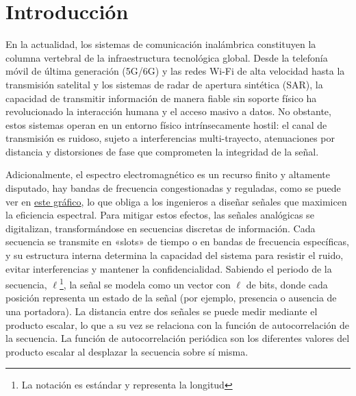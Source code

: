 \documentclass[12pt,a4paper]{tfg_domingo}
\begin{document}

\portada
\frontmatter
\gracias{}
\resumen{}{}
\tableofcontents

\mainmatter

\chapter{Introducción}

En la actualidad, los sistemas de comunicación inalámbrica constituyen
la columna vertebral de la infraestructura tecnológica global. Desde
la telefonía móvil de última generación (5G/6G) y las redes Wi-Fi de
alta velocidad hasta la transmisión satelital y los sistemas de radar
de apertura sintética (SAR), la capacidad de transmitir información de
manera fiable sin soporte físico ha revolucionado la interacción
humana y el acceso masivo a datos. No obstante, estos sistemas operan
en un entorno físico intrínsecamente hostil: el canal de transmisión
es ruidoso, sujeto a interferencias multi-trayecto, atenuaciones por
distancia y distorsiones de fase que comprometen la integridad de la
señal. 

Adicionalmente, el espectro electromagnético es un recurso finito y
altamente disputado, hay bandas de frecuencia congestionadas y
reguladas, como se puede ver en  \href{https://avance.digital.gob.es/espectro/Documents/Poster-CNAF.pdf}{este gráfico}, lo que obliga a los ingenieros a diseñar señales que
maximicen la eficiencia espectral. 
Para mitigar estos efectos, las
señales analógicas se digitalizan, transformándose en secuencias
discretas de información. Cada secuencia se transmite en «slots» de
tiempo o en bandas de frecuencia específicas, y su estructura interna
determina la capacidad del sistema para resistir el ruido, evitar
interferencias y mantener la confidencialidad.
Sabiendo el periodo de la secuencia, $\ell$\footnote{La notación es
  estándar y representa la longitud}, la señal se modela como un
vector con $\ell$ de bits, donde cada posición representa un estado de la señal
(por ejemplo, presencia o ausencia de una portadora). La distancia
entre dos señales se puede medir mediante el producto escalar, lo que
a su vez se relaciona con la función de autocorrelación de la
secuencia. La función de autocorrelación periódica son los diferentes
valores del producto escalar al desplazar la secuencia sobre sí
misma.
\end{document}
